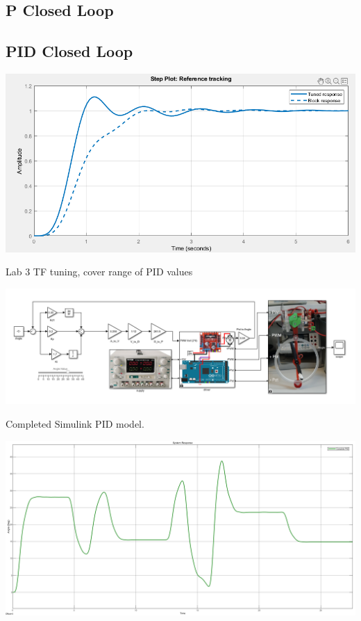 \documentclass[a4paper,11pt]{article}
\begin{document}
\subsection*{P Closed Loop}

\subsection*{PID Closed Loop}
\includegraphics[width=\textwidth]{inc/lab3_reponse_PID.png}
\begin{center}
        Lab 3 TF tuning, cover range of PID values
\end{center}
\includegraphics[width=\textwidth]{inc/PID_sim.png}
\begin{center}
        Completed Simulink PID model.
\end{center}
\includegraphics[width=\textwidth]{inc/pidlong.png}
    
\end{document}
